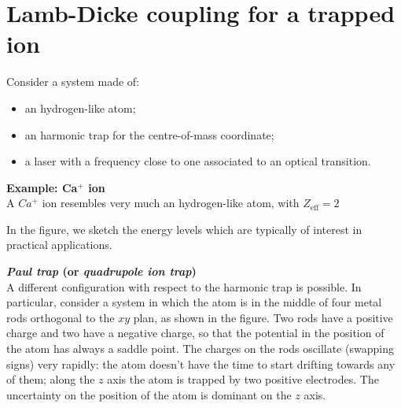 \section{Lamb-Dicke coupling for a trapped ion}
Consider a system made of: 
\begin{itemize}
    \item an hydrogen-like atom;
    \item an harmonic trap for the centre-of-mass coordinate; 
    \item a laser with a frequency close to one associated to an optical transition.
\end{itemize}

\begin{center}

\end{center}


\begin{tcolorbox} 
\textbf{Example: Ca$^+$ ion} \\
A $Ca^+$ ion resembles very much an hydrogen-like atom, with $Z_{\text{eff}}=2$
\begin{center}

\end{center}
In the figure, we sketch the energy levels which are typically of interest in practical applications. 
\end{tcolorbox}


\begin{tcolorbox} 
\textbf{\textit{Paul trap} (or \textit{quadrupole ion trap})} \\
A different configuration with respect to the harmonic trap is possible. In particular, consider a system in which the atom is in the middle of four metal rods orthogonal to the $xy$ plan, as shown in the figure. Two rods have a positive charge and two have a negative charge, so that the potential in the position of the atom has always a saddle point. The charges on the rods oscillate (swapping signs) very rapidly: the atom doesn't have the time to start drifting towards any of them; along the $z$ axis the atom is trapped by two positive electrodes. The uncertainty on the position of the atom is dominant on the $z$ axis.
\begin{center}
\scalebox{1.3}{
    
}
\end{center}
\end{tcolorbox}

